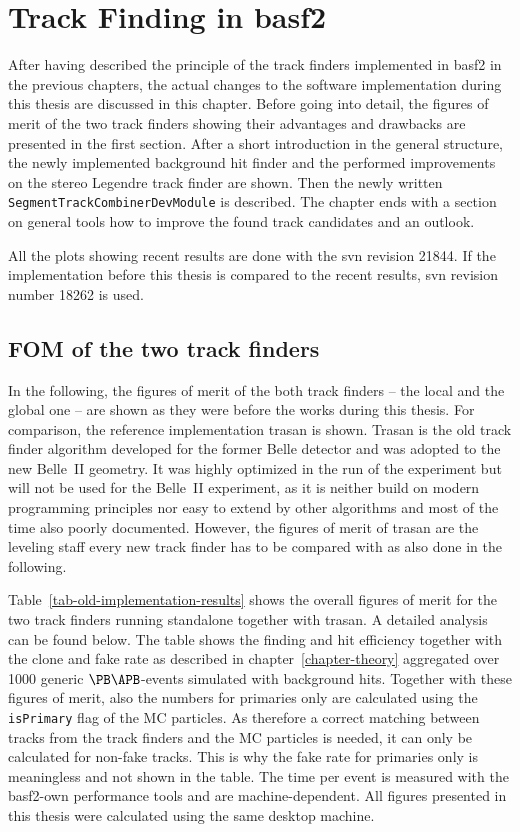 \chapter{Track Finding in basf2} \label{chapter-workflow}

After having described the principle of the track finders implemented in basf2 in the previous chapters, the actual changes to the software implementation during this thesis are discussed in this chapter. Before going into detail, the figures of merit of the two track finders showing their advantages and drawbacks are presented in the first section. After a short introduction in the general structure, the newly implemented background hit finder and the performed improvements on the stereo Legendre track finder are shown. Then the newly written \texttt{SegmentTrackCombinerDevModule} is described. The chapter ends with a section on general tools how to improve the found track candidates and an outlook.

All the plots showing recent results are done with the svn revision 21844. If the implementation before this thesis is compared to the recent results, svn revision number 18262 is used.

\section{FOM of the two track finders} \label{section-fom}

In the following, the figures of merit of the both track finders -- the local and the global one -- are shown as they were before the works during this thesis. For comparison, the reference implementation trasan is shown. Trasan is the old track finder algorithm developed for the former Belle detector and was adopted to the new Belle~II geometry. It was highly optimized in the run of the experiment but will not be used for the Belle~II experiment, as it is neither build on modern programming principles nor easy to extend by other algorithms and most of the time also poorly documented. However, the figures of merit of trasan are the leveling staff every new track finder has to be compared with as also done in the following.

Table~\ref{tab-old-implementation-results} shows the overall figures of merit for the two track finders running standalone together with trasan. A detailed analysis can be found below. The table shows the finding and hit efficiency together with the clone and fake rate as described in chapter~\ref{chapter-theory} aggregated over 1000 generic $\PB \APB$-events simulated with background hits. Together with these figures of merit, also the numbers for primaries only are calculated using the \verb+isPrimary+ flag of the MC particles. As therefore a correct matching between tracks from the track finders and the MC particles is needed, it can only be calculated for non-fake tracks. This is why the fake rate for primaries only is meaningless and not shown in the table. The time per event is measured with the basf2-own performance tools and are machine-dependent. All figures presented in this thesis were calculated using the same desktop machine.

